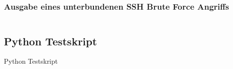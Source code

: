 \subsubsection{Ausgabe eines unterbundenen SSH Brute Force Angriffs}
\inputminted[breaklines=true,firstline=34, lastline=42]{text}{code/output/sshguard.txt}\label{listing:sshguard_log}

\subsection{Python Testskript}\label{kap:testskript_python}
\begin{longlisting}
    \caption{Python Testskript}
\end{longlisting}
